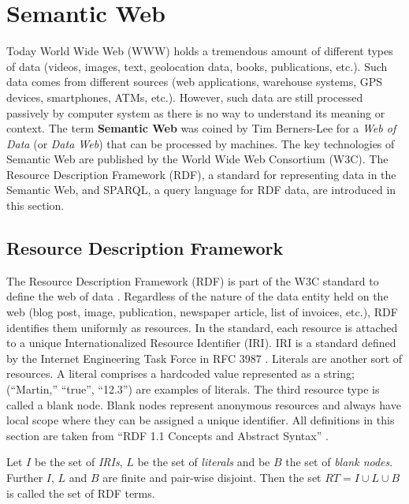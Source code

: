 \section{Semantic Web}
\label{sec:preliminaries:semanticweb}

Today World Wide Web (WWW) holds a tremendous amount of different types of data (videos, images, text, geolocation data, books, publications, etc.). 
Such data comes from different sources (web applications, warehouse systems, GPS devices, smartphones, ATMs, etc.).
However, such data are still processed passively by computer system as there is no way to understand its meaning or context.
The term \textbf{Semantic Web} was coined by Tim Berners-Lee for a \textit{Web of Data} (or \textit{Data Web}) \cite{LeeWeavingTheWeb} that can be processed by machines. 
The key technologies of Semantic Web are published by the World Wide Web Consortium (W3C). 
The Resource Description Framework (RDF), a standard for representing data in the Semantic Web, and SPARQL, a query language for RDF data, are introduced in this section.

\subsection{Resource Description Framework}
\label{sec:rdf}
The Resource Description Framework (RDF) is part of the W3C standard to define the web of data \cite{rdfonline}. Regardless of the nature of the data entity held on the web (blog post, image, publication, newspaper article,  list of invoices, etc.), RDF identifies them uniformly as resources. In the standard, each resource is attached to a unique Internationalized Resource Identifier (IRI). IRI is a standard defined by the Internet Engineering Task Force in RFC 3987 \cite{Pasd}. Literals are another sort of resources. A literal comprises a hardcoded value represented as a string; (“Martin,” “true”, “12.3”) are examples of literals. The third resource type is called a blank node. Blank nodes represent anonymous resources and always have local scope where they can be assigned a unique identifier. All definitions in this section are taken from “RDF 1.1 Concepts and Abstract Syntax” \cite{asd}. \\

\begin{definition}
Let $I$ be the set of \textit{IRIs}, $L$ be the set of \textit{literals} and be $B$ the set of
\textit{blank nodes}. Further $I$, $L$ and $B$ are finite and pair-wise disjoint. Then the set $RT = I \cup L \cup B$ is called the set of RDF terms. 
\end{definition}

